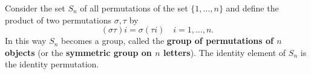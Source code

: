 Consider the set $S_n$ of all permutations of the set $\{1, \ldots, n\}$ and define the product of two permutations $\sigma, \tau$ by
$$(\sigma \tau)i = \sigma(\tau i) \quad i = 1, \ldots, n.$$
In this way $S_n$ becomes a group, called the \textbf{group of permutations of $n$ objects} (or the \textbf{symmetric group on $n$ letters}). The identity element of $S_n$ is the identity permutation.
